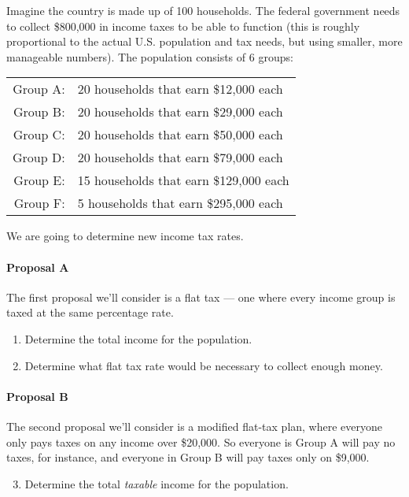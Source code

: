 \begin{exercises}
{Imagine the country is made up of 100 households.  The federal government needs to collect \$800,000 in income taxes to be able to function (this is roughly proportional to the actual U.S. population and tax needs, but using smaller, more manageable numbers).  The population consists of 6 groups:
\begin{center}
\begin{tabular}{r l}
Group A: & 20 households that earn \$12,000 each\\
Group B: & 20 households that earn \$29,000 each\\
Group C: & 20 households that earn \$50,000 each\\
Group D: & 20 households that earn \$79,000 each\\
Group E: & 15 households that earn \$129,000 each\\
Group F: & 5 households that earn \$295,000 each
\end{tabular}
\end{center}
We are going to determine new income tax rates.

\paragraph{Proposal A} The first proposal we'll consider is a flat tax --- one where every income group is taxed at the same percentage rate.
\begin{enumerate}[1)]
\item Determine the total income for the population.
\vspace{1in}

\item Determine what flat tax rate would be necessary to collect enough money.
\vspace{1in}
\end{enumerate}

\paragraph{Proposal B} The second proposal we'll consider is a modified flat-tax plan, where everyone only pays taxes on any income over \$20,000.  So everyone is Group A will pay no taxes, for instance, and everyone in Group B will pay taxes only on \$9,000.
\begin{enumerate}[1)]
\setcounter{enumi}{2}
\item Determine the total \textit{taxable} income for the population.
\vspace{1in}


\end{enumerate}}
\end{exercises}
